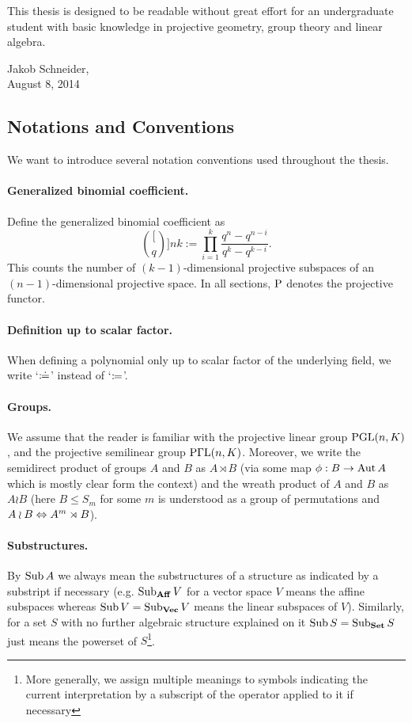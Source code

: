 This thesis is designed to be readable without great effort for an undergraduate student with basic knowledge in projective geometry, group theory and linear algebra.

\begin{flushright}
    Jakob Schneider,\\
    August 8, 2014
\end{flushright}

\subsection*{Notations and Conventions}\label{not-conv}%

We want to introduce several notation conventions used throughout the thesis.

\paragraph{Generalized binomial coefficient.}
Define the generalized binomial coefficient as
$$
\binom[q]{n}{k}:= \prod_{i=1}^{k}{\frac{q^n-q^{n-i}}{q^k-q^{k-i}}}.
$$
This counts the number of $(k-1)$-dimensional projective subspaces of an $(n-1)$-dimensional projective space.
In all sections, $\P$ denotes the projective functor. %

\paragraph{Definition up to scalar factor.}
When defining a polynomial only up to scalar factor of the underlying field, we write `$\mathrel{\mathrel{\mathop:}\mkern-1.2mu\doteq}$' instead of `$\mathrel{\mathrel{\mathop:}\mkern-1.2mu=}$'.
%
\paragraph{Groups.} We assume that the reader is familiar with the projective linear group $\mathrm{PGL}(n,K)$, and the projective semilinear group $\mathrm{P\Gamma L}(n,K)$. Moreover, we write the semidirect product of groups $A$ and $B$ as $A\rtimes B$ (via some map $\phi:B\rightarrow\mathop{\mathrm{Aut}}\nolimits A$ which is mostly clear form the context) and the wreath product of $A$ and $B$ as $A\wr B$ (here $B\leq S_m$ for some $m$ is understood as a group of permutations and $A\wr B\iso A^m\rtimes B$).

\paragraph{Substructures.} By $\mathop{\mathrm{Sub}}\nolimits A$ we always mean the substructures of a structure as indicated by a substript if necessary (e.g. $\mathop{\mathrm{Sub}}\nolimits_{\mathbf{Aff}}V$ for a vector space $V$ means the affine subspaces whereas $\mathop{\mathrm{Sub}}\nolimits V=\mathop{\mathrm{Sub}}\nolimits_{\mathbf{Vec}} V$ means the linear subspaces of $V$). Similarly, for a set $S$ with no further algebraic structure explained on it $\mathop{\mathrm{Sub}}\nolimits S=\mathop{\mathrm{Sub}}\nolimits_{\mathbf{Set}} S$ just means the powerset of $S$\footnote{More generally, we assign multiple meanings to symbols indicating the current interpretation by a subscript of the operator applied to it if necessary}.

